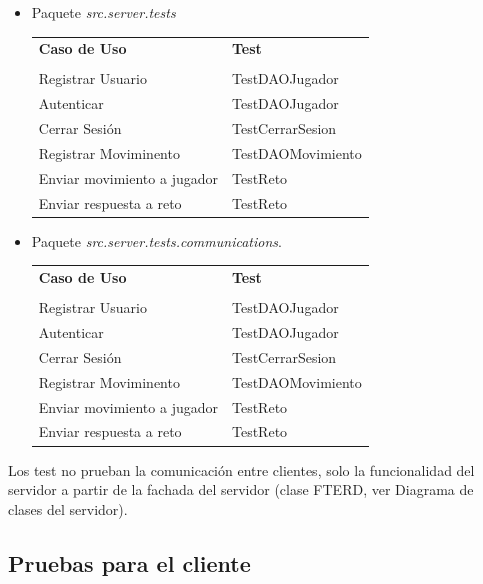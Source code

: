 \documentclass[a4paper,11pt,oneside]{article}
\begin{document}
\begin{itemize}
\item Paquete \emph{src.server.tests}

\begin{center}
{\footnotesize
\begin{tabularx}{0.95\textwidth}{p{}|X}

\textbf{Caso de Uso} & \textbf{Test} \\
& \\
Registrar Usuario & TestDAOJugador\\
Autenticar & TestDAOJugador\\
Cerrar Sesión & TestCerrarSesion\\
Registrar Moviminento & TestDAOMovimiento\\
Enviar movimiento a jugador & TestReto\\
Enviar respuesta a reto & TestReto\\
\end{tabularx}
}
\end{center}

\item Paquete \emph{src.server.tests.communications}.
\begin{center}
{\footnotesize
\begin{tabularx}{0.95\textwidth}{p{}|X}
\textbf{Caso de Uso} & \textbf{Test} \\
& \\
Registrar Usuario & TestDAOJugador\\
Autenticar & TestDAOJugador\\
Cerrar Sesión & TestCerrarSesion\\
Registrar Moviminento & TestDAOMovimiento\\
Enviar movimiento a jugador & TestReto\\
Enviar respuesta a reto & TestReto\\
\end{tabularx}
}
\end{center}
\end{itemize}

Los test no prueban la comunicación entre clientes, solo la funcionalidad del servidor a partir de la fachada del servidor (clase FTERD, ver Diagrama de clases del servidor).
\clearpage

\subsection{Pruebas para el cliente}
\end{document}
